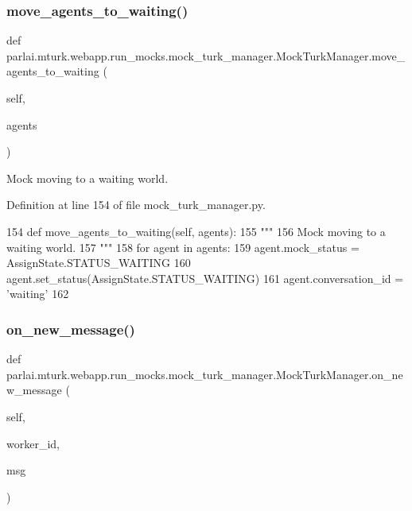 \subsubsection{\texorpdfstring{move\+\_\+agents\+\_\+to\+\_\+waiting()}{move\_agents\_to\_waiting()}}
{\footnotesize\ttfamily def parlai.\+mturk.\+webapp.\+run\+\_\+mocks.\+mock\+\_\+turk\+\_\+manager.\+Mock\+Turk\+Manager.\+move\+\_\+agents\+\_\+to\+\_\+waiting (\begin{DoxyParamCaption}\item[{}]{self,  }\item[{}]{agents }\end{DoxyParamCaption})}

\begin{DoxyVerb}Mock moving to a waiting world.
\end{DoxyVerb}
 

Definition at line 154 of file mock\+\_\+turk\+\_\+manager.\+py.


\begin{DoxyCode}
154     \textcolor{keyword}{def }move\_agents\_to\_waiting(self, agents):
155         \textcolor{stringliteral}{"""}
156 \textcolor{stringliteral}{        Mock moving to a waiting world.}
157 \textcolor{stringliteral}{        """}
158         \textcolor{keywordflow}{for} agent \textcolor{keywordflow}{in} agents:
159             agent.mock\_status = AssignState.STATUS\_WAITING
160             agent.set\_status(AssignState.STATUS\_WAITING)
161             agent.conversation\_id = \textcolor{stringliteral}{'waiting'}
162 
\end{DoxyCode}
\mbox{\label{classparlai_1_1mturk_1_1webapp_1_1run__mocks_1_1mock__turk__manager_1_1MockTurkManager_a22ec87467bf13a9c44ad6c138a353ff4}} 
\subsubsection{\texorpdfstring{on\+\_\+new\+\_\+message()}{on\_new\_message()}}
{\footnotesize\ttfamily def parlai.\+mturk.\+webapp.\+run\+\_\+mocks.\+mock\+\_\+turk\+\_\+manager.\+Mock\+Turk\+Manager.\+on\+\_\+new\+\_\+message (\begin{DoxyParamCaption}\item[{}]{self,  }\item[{}]{worker\+\_\+id,  }\item[{}]{msg }\end{DoxyParamCaption})}



